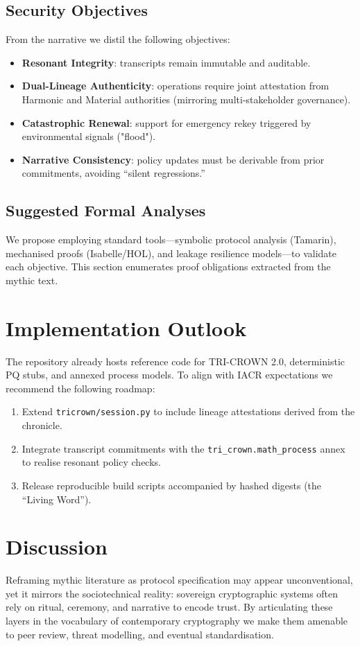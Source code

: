 \documentclass[submission]{iacrtrans}
\begin{document}
\subsection{Security Objectives}
From the narrative we distil the following objectives:
\begin{itemize}
    \item \textbf{Resonant Integrity}: transcripts remain immutable and auditable.
    \item \textbf{Dual-Lineage Authenticity}: operations require joint attestation from Harmonic and Material authorities (mirroring multi-stakeholder governance).
    \item \textbf{Catastrophic Renewal}: support for emergency rekey triggered by environmental signals ("flood").
    \item \textbf{Narrative Consistency}: policy updates must be derivable from prior commitments, avoiding ``silent regressions.''
\end{itemize}

\subsection{Suggested Formal Analyses}
We propose employing standard tools---symbolic protocol analysis (Tamarin), mechanised proofs (Isabelle/HOL), and leakage resilience models---to validate each objective. This section enumerates proof obligations extracted from the mythic text.

\section{Implementation Outlook}
The repository already hosts reference code for TRI-CROWN 2.0, deterministic PQ stubs, and annexed process models. To align with IACR expectations we recommend the following roadmap:
\begin{enumerate}
    \item Extend \texttt{tricrown/session.py} to include lineage attestations derived from the chronicle.
    \item Integrate transcript commitments with the \texttt{tri\_crown.math\_process} annex to realise resonant policy checks.
    \item Release reproducible build scripts accompanied by hashed digests (the ``Living Word'').
\end{enumerate}

\section{Discussion}
Reframing mythic literature as protocol specification may appear unconventional, yet it mirrors the sociotechnical reality: sovereign cryptographic systems often rely on ritual, ceremony, and narrative to encode trust. By articulating these layers in the vocabulary of contemporary cryptography we make them amenable to peer review, threat modelling, and eventual standardisation.
\end{document}

